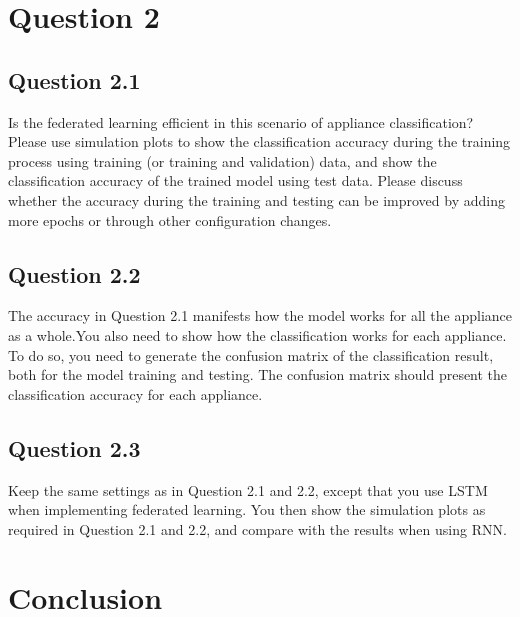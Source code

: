 \documentclass[a4paper, article, oneside, USenglish, IN5460]{memoir}
\begin{document}
\chapter{Question 2}

\section{Question 2.1}

Is the federated learning efficient in this scenario of appliance classification? Please use simulation plots to show the classification accuracy during the training process using training (or training and validation) data, and show the classification accuracy of the trained model using test data. Please discuss whether the accuracy during the training and testing can be improved by adding more epochs or through other configuration changes.

\section{Question 2.2}

The accuracy in Question 2.1 manifests how the model works for all the appliance as a whole.You also need to show how the classification works for each appliance. To do so, you need to generate the confusion matrix of the classification result, both for the model training and testing. The confusion matrix should present the classification accuracy for each appliance.

\section{Question 2.3}

Keep the same settings as in Question 2.1 and 2.2, except that you use LSTM when implementing federated learning. You then show the simulation plots as required in Question 2.1 and 2.2, and compare with the results when using RNN.

\chapter{Conclusion}

\nocite{openfl_citation}

\printbibliography{}

\vspace*{10mm}
\end{document}
